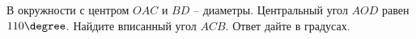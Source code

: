 \begin{ex}
	\begin{condition}
		В окружности с центром \(O AC\) и \( BD \) – диаметры. Центральный угол \( AOD \) равен \( 110\degree\). Найдите вписанный угол \( ACB \). Ответ дайте в градусах.
	\end{condition}
\end{ex}